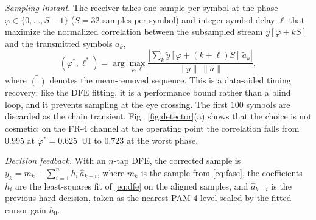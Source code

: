 \documentclass[twocolumn]{USG}
\begin{document}
\emph{Sampling instant.} The receiver takes one sample per symbol at the phase
$\varphi\in\{0,\dots,S-1\}$ ($S=32$ samples per symbol) and integer symbol
delay $\ell$ that maximize the normalized correlation between the subsampled
stream $y[\varphi+kS]$ and the transmitted symbols $a_k$,
\begin{equation}
(\varphi^{\ast},\ell^{\ast})=\arg\max_{\varphi,\ell}
\frac{\left|\sum_{k}\tilde{y}[\varphi+(k{+}\ell)S]\,\tilde{a}_k\right|}
{\|\tilde{y}\|\,\|\tilde{a}\|},
\label{eq:fase}
\end{equation}
where $\tilde{(\cdot)}$ denotes the mean-removed sequence. This is a
data-aided timing recovery: like the DFE fitting, it is a performance bound
rather than a blind loop, and it prevents sampling at the eye crossing. The
first $100$ symbols are discarded as the chain transient. Fig.~\ref{fig:detector}(a)
shows that the choice is not cosmetic: on the FR-4 channel at the operating
point the correlation falls from $0.995$ at $\varphi^{\ast}=0.625$~UI to
$0.723$ at the worst phase.

\emph{Decision feedback.} With an $n$-tap DFE, the corrected sample is
$y_k=m_k-\sum_{i=1}^{n} h_i\,\hat{a}_{k-i}$, where $m_k$ is the sample from
\eqref{eq:fase}, the coefficients $h_i$ are the least-squares fit of
\eqref{eq:dfe} on the aligned samples, and $\hat{a}_{k-i}$ is the previous hard
decision, taken as the nearest PAM-4 level scaled by the fitted cursor gain
$h_0$.
\end{document}
